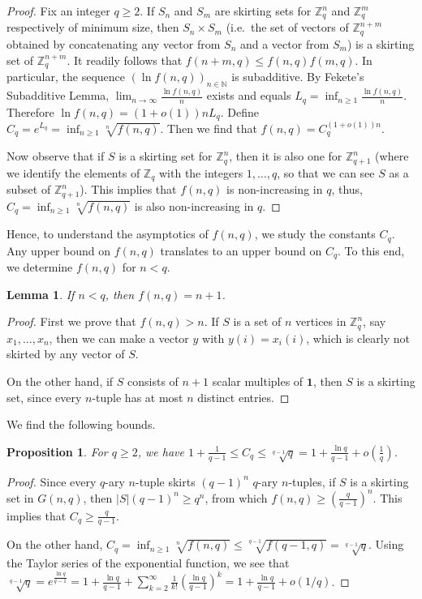 \documentclass[12pt,reqno]{article}
\newtheorem{lm}[thm]{Lemma}
\newtheorem{prop}[thm]{Proposition}
\newcommand{\ZZ}{\mathbb Z}
\newcommand{\one}{\mathbf 1}
\begin{document}
\begin{proof}
 Fix an integer $q \geq 2$.
 If $S_n$ and $S_m$ are skirting sets for $\ZZ_q^n$ and $\ZZ_q^m$ respectively of minimum size, then $S_n \times S_m$ (i.e.\ the set of vectors of $\ZZ_q^{n+m}$ obtained by concatenating any vector from $S_n$ and a vector from $S_m$) is a skirting set of $\ZZ_q^{n+m}$.
 It readily follows that $f(n+m,q) \leq f(n,q) f(m,q)$.
 In particular, the sequence $( \ln f(n,q) )_{n \in \mathbb N}$ is subadditive.
 By Fekete's Subadditive Lemma, $\lim_{n \to \infty} \frac{\ln f(n,q)}n$ exists and equals $L_q = \inf_{n \geq 1} \frac{\ln f(n,q)}n$.
 Therefore $\ln f(n,q) = (1+o(1)) n L_q$.
 Define $C_q = e^{L_q} = \inf_{n \geq 1} \sqrt[n]{f(n,q)}$.
 Then we find that $f(n,q) = C_q^{(1+o(1))n}$.

 Now observe that if $S$ is a skirting set for $\ZZ_q^n$, then it is also one for $\ZZ_{q+1}^n$ (where we identify the elements of $\ZZ_q$ with the integers $1, \dots, q$, so that we can see $S$ as a subset of $\ZZ_{q+1}^n$).
 This implies that $f(n,q)$ is non-increasing in $q$, thus, $C_q = \inf_{n \geq 1} \sqrt[n]{f(n,q)}$ is also non-increasing in $q$.
\end{proof}

Hence, to understand the asymptotics of $f(n,q)$, we study the constants $C_q$.
Any upper bound on $f(n,q)$ translates to an upper bound on $C_q$.
To this end, we determine $f(n,q)$ for $n < q$.

\begin{lm}
 If $n < q$, then $f(n,q) = n+1$.
\end{lm}

\begin{proof}
 First we prove that $f(n,q) > n$.
 If $S$ is a set of $n$ vertices in $\ZZ_q^n$, say $x_1, \dots, x_n$, then we can make a vector $y$ with $y(i) = x_i(i)$, which is clearly not skirted by any vector of $S$.

 On the other hand, if $S$ consists of $n+1$ scalar multiples of $\one$, then $S$ is a skirting set, since every $n$-tuple has at most $n$ distinct entries.
\end{proof}

We find the following bounds.

\begin{prop}
 \label{Prop:Bounds}
 For $q \geq 2$, we have $1 + \frac 1{q-1} \leq C_q \leq \sqrt[q-1] q = 1 + \frac{\ln q}{q-1} + o\left( \frac 1q \right)$.
\end{prop}

\begin{proof}
 Since every $q$-ary $n$-tuple skirts $(q-1)^n$ $q$-ary $n$-tuples, if $S$ is a skirting set in $G(n,q)$, then $|S| (q-1)^n \geq q^n$, from which $f(n,q) \geq \left( \frac q{q-1} \right)^n$.
 This implies that $C_q \geq \frac q{q-1}$.
 
 On the other hand, $C_q = \inf_{n \geq 1} \sqrt[n]{f(n,q)} \leq \sqrt[q-1]{f(q-1,q)} = \sqrt[q-1]{q}$.
 Using the Taylor series of the exponential function, we see that $\sqrt[q-1]q = e^{\frac{\ln q}{q-1}} = 1 + \frac{\ln q}{q-1} + \sum_{k=2}^\infty \frac 1{k!} \left( \frac {\ln q}{q-1} \right)^k = 1 + \frac{\ln q} {q-1} + o(1/q)$.
\end{proof}
\end{document}
